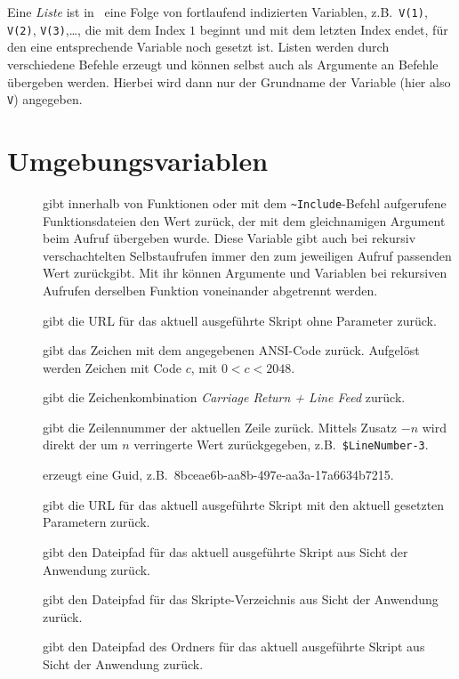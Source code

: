 \begin{basisformat}\label{defListen}
Eine \emph{Liste} ist in \FPZ\ eine Folge von fortlaufend indizierten Variablen, z.B.\ \verb|V(1)|, \verb|V(2)|, \verb|V(3)|,\dots , die mit dem Index $1$ beginnt und mit dem letzten Index endet, für den eine entsprechende Variable noch gesetzt ist. Listen werden durch verschiedene Befehle erzeugt und können selbst auch als Argumente an Befehle übergeben werden. Hierbei wird dann nur der Grundname der Variable (hier also \verb|V|) angegeben.
\end{basisformat}

\section{Umgebungsvariablen}

\begin{description}
\item[] gibt innerhalb von Funktionen oder mit dem  \verb|~Include|-Befehl aufgerufene Funktionsdateien den Wert zurück, der mit dem gleichnamigen Argument beim Aufruf übergeben wurde. Diese Variable gibt auch bei rekursiv verschachtelten Selbstaufrufen immer den zum jeweiligen Aufruf passenden Wert zurückgibt. Mit ihr können Argumente und Variablen bei rekursiven Aufrufen derselben Funktion voneinander abgetrennt werden.

\item[] gibt die URL für das aktuell ausgeführte Skript ohne Parameter zurück.

\item[] gibt das Zeichen mit dem angegebenen ANSI-Code zurück. Aufgelöst werden Zeichen mit Code $c$, mit $0<c<2048$.

\item[] gibt die Zeichenkombination \emph{Carriage Return + Line Feed} zurück.

\item[] gibt die Zeilennummer der aktuellen Zeile zurück. Mittels Zusatz $-n$ wird direkt der um $n$ verringerte Wert zurückgegeben, z.B.\ \verb|$LineNumber-3|.

\item[] erzeugt eine Guid, z.B.\ 8bceae6b-aa8b-497e-aa3a-17a6634b7215.

\item[] gibt die URL für das aktuell ausgeführte Skript mit den aktuell gesetzten Parametern zurück.

\item[] gibt den Dateipfad für das aktuell ausgeführte Skript aus Sicht der Anwendung zurück.

\item[] gibt den Dateipfad für das Skripte-Verzeichnis aus Sicht der Anwendung zurück.

\item[] gibt den Dateipfad des Ordners für das aktuell ausgeführte Skript aus Sicht der Anwendung zurück.
\end{description}

